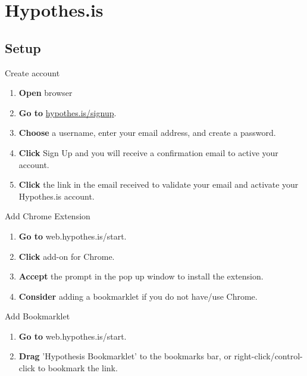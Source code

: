 \documentclass[10pt,a4paper]{article}
\begin{document}


\section{Hypothes.is}
\subsection{Setup}

\begin{textbox}{Create account}
 

  

\begin{enumerate}
\item \textbf{Open} browser
\item \textbf{Go to} \href{hypothes.is/signup}{hypothes.is/signup}. 
\item \textbf{Choose} a username, enter your email address, and create a password.
\item \textbf{Click} Sign Up and you will receive a confirmation email to active your account.
\item \textbf{Click} the link in the email received to validate your email and activate your Hypothes.is account.
\end{enumerate}

\end{textbox}

\begin{textbox}{Add Chrome Extension}
 

  

\begin{enumerate}
\item \textbf{Go to} web.hypothes.is/start. 
\item \textbf{Click} add-on for Chrome.
\item \textbf{Accept} the prompt in the pop up window to install the extension. 
\item \textbf{Consider} adding a bookmarklet if you do not have/use Chrome.
\end{enumerate}

\end{textbox}

\begin{textbox}{Add Bookmarklet}
 

  

\begin{enumerate}
\item \textbf{Go to} web.hypothes.is/start. 
\item \textbf{Drag} 'Hypothesis Bookmarklet' to the bookmarks bar, or right-click/control-click to bookmark the link.
\end{enumerate}

\end{textbox}
\end{document}
